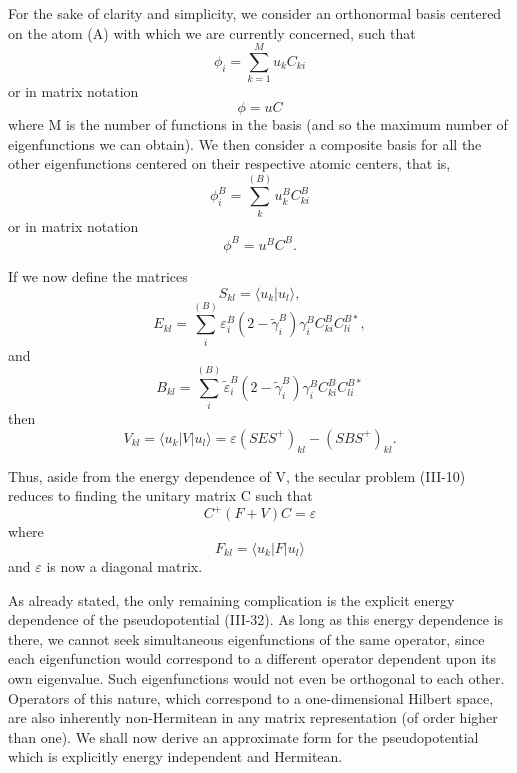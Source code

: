 \documentclass[12pt,letterpaper]{report}
\begin{document}
For the sake of clarity and simplicity, we consider an orthonormal basis centered on the atom (A) with which we are currently concerned, such that
\begin{equation}
\phi_i = \sum_{k=1}^M u_k C_{ki}
\end{equation}
or in matrix notation
\begin{equation}
\phi = uC
\end{equation}
where M is the number of functions in the basis (and so the maximum number of eigenfunctions we can obtain). We then consider a composite basis for all the other eigenfunctions centered on their respective atomic centers, that is,
\begin{equation}
\phi_i^B = \sum_k^{(B)} u_k^B C_{ki}^B
\end{equation}
or in matrix notation
\begin{equation}
\phi^B = u^B C^B.
\end{equation}

If we now define the matrices
\begin{equation}
S_{kl} = \langle u_k | u_l \rangle,
\end{equation}
\begin{equation}
E_{kl} = \sum_i^{(B)} \varepsilon_i^B (2 - \tilde{\gamma}_i^B) \gamma_i^B C_{ki}^B C_{li}^{B*},
\end{equation}
and
\begin{equation}
B_{kl} = \sum_i^{(B)} \tilde{\varepsilon}_i^B (2 - \tilde{\gamma}_i^B) \gamma_i^B C_{ki}^B C_{li}^{B*}
\end{equation}
then
\begin{equation}
V_{kl} = \langle u_k | V | u_l \rangle = \varepsilon(SES^+)_{kl} - (SBS^+)_{kl}.
\end{equation}

Thus, aside from the energy dependence of V, the secular problem (III-10) reduces to finding the unitary matrix C such that
\begin{equation}
C^+(F + V)C = \varepsilon
\end{equation}
where
\begin{equation}
F_{kl} = \langle u_k | F | u_l \rangle
\end{equation}
and $\varepsilon$ is now a diagonal matrix.

As already stated, the only remaining complication is the explicit energy dependence of the pseudopotential (III-32). As long as this energy dependence is there, we cannot seek simultaneous eigenfunctions of the same operator, since each eigenfunction would correspond to a different operator dependent upon its own eigenvalue. Such eigenfunctions would not even be orthogonal to each other. Operators of this nature, which correspond to a one-dimensional Hilbert space, are also inherently non-Hermitean in any matrix representation (of order higher than one). We shall now derive an approximate form for the pseudopotential which is explicitly energy independent and Hermitean.
\end{document}
